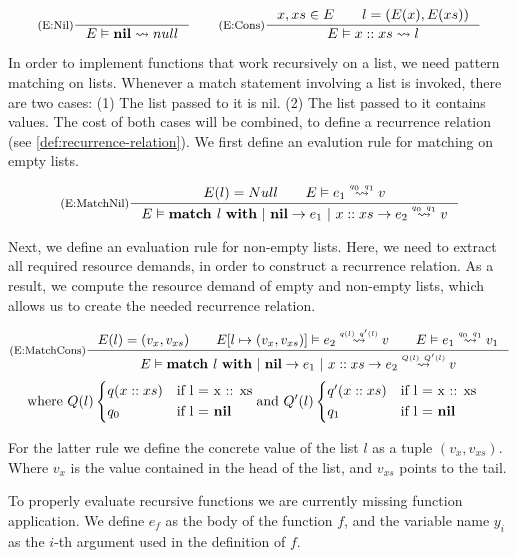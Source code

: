 \[
   \inference[(E:Nil)]
   {}
   {\evals{E}{\listnil}{null}{}{}}
   \qquad
   \inference[(E:Cons)]
   {\contains{E}{x, xs} \qquad l = (E(x), E(xs))}
   {\evals{E}{\cons{x}{xs}}{l}{}{}}
\]

In order to implement functions that work recursively on a list, we need pattern matching on lists. Whenever a match statement involving a list is invoked, there are two cases: (1) The list passed to it is nil. (2) The list passed to it contains values. The cost of both cases will be combined, to define a recurrence relation (see \cref{def:recurrence-relation}). We first define an evalution rule for matching on empty lists.

\[
   \inference[(E:MatchNil)]
   {E(l) = Null \qquad \evals{E}{e_1}{v}{q_0}{q_1}}
   {\evals{E}{\listmatch{l}{e_1}{e_2}}{v}{q_0}{q_1}}
\]

Next, we define an evaluation rule for non-empty lists. Here, we need to extract all required resource demands, in order to construct a recurrence relation. As a result, we compute the resource demand of empty and non-empty lists, which allows us to create the needed recurrence relation.

\[
   \inference[(E:MatchCons)]
   {E(l) = (v_x, v_{xs}) \qquad \evals{\envaugment{E}{l}{(v_x, v_{xs})}}{e_2}{v}{q(l)}{q'(l)} \qquad \evals{E}{e_1}{v_1}{q_0}{q_1}}
   {\evals{E}{\listmatch{l}{e_1}{e_2}}{v}{Q(l)}{Q'(l)}}
\]
\[
   \begin{aligned}
      \text{where }  & Q(l) \begin{cases*}
         q(x :: xs)     & if l = x :: xs\\
         q_0            & if l = \listnil
         \end{cases*} \text{and } Q'(l) \begin{cases*}
         q'(x :: xs)     & if l = x :: xs\\
         q_1            & if l = \listnil
      \end{cases*}
   \end{aligned}
\]

For the latter rule we define the concrete value of the list \(l\) as a tuple \((v_x, v_{xs})\). Where \(v_x\) is the value contained in the head of the list, and \(v_{xs}\) points to the tail. 

To properly evaluate recursive functions we are currently missing function application. We define \(e_f\) as the body of the function \(f\), and the variable name \(y_i\) as the \(i\)-th argument used in the definition of \(f\). 

